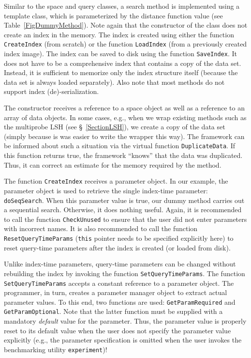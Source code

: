 \documentclass[runningheads,a4paper]{llncs}
\newcommand{\ttt}[1]{\texttt{#1}}
\begin{document}
Similar to the space and query classes, a search method is implemented using
a template class, which is parameterized by the distance function value (see Table~\ref{FigDummyMethod}).
Note again that the constructor of the class does not create an index in the memory.
The index is created using either the function \ttt{CreateIndex} (from scratch)
or the function \ttt{LoadIndex} (from a previously created index image).
The index can be saved to disk using the function \ttt{SaveIndex}.
It does not have to be a comprehensive index that contains a copy of the data set.
Instead, it is sufficient to memorize only the index structure itself (because
the data set is always loaded separately).
Also note that most methods do not support index (de)-serialization.

The constructor receives a reference to a space object as well as  a reference to an array of data objects. 
In some cases, e.g., when we wrap existing methods such as the multiprobe LSH (see \S~\ref{SectionLSH}),
we create a copy of the data set (simply because is was easier to write the wrapper this way).
The framework can be informed about such a situation via the virtual function \ttt{DuplicateData}.
If this function returns true, the framework ``knows'' that the data was duplicated.
Thus, it can correct an estimate for the memory required by the method. 

The function \ttt{CreateIndex} receives a parameter object.
In our example, the parameter object is used to retrieve the single index-time parameter: \ttt{doSeqSearch}.
When this parameter value is true, our dummy method carries out a sequential search.
Otherwise, it does nothing useful.
Again, it is recommended to call the function \ttt{CheckUnused} to ensure
that the user did not enter parameters with incorrect names.
It is also recommended to call the function \ttt{ResetQueryTimeParams} (\ttt{this} pointer needs to
be specified explicitly here) to reset query-time parameters after the index is created (or loaded from disk).

Unlike index-time parameters, query-time parameters can be changed without rebuilding the index
by invoking the function \ttt{SetQueryTimeParams}.
The function \ttt{SetQueryTimeParams} accepts a constant reference to a parameter object.
The programmer, in turn, creates a parameter manager object to extract actual parameter values.
To this end, two functions are used: \ttt{GetParamRequired} and \ttt{GetParamOptional}.
Note that the latter function must be supplied with a mandatory \emph{default} value for the parameter.
Thus, the parameter value is properly reset to its default value when the user does not specify the parameter value
explicitly (e.g., the parameter specification is omitted when the user invokes the benchmarking utility \ttt{experiment})!
\end{document}
